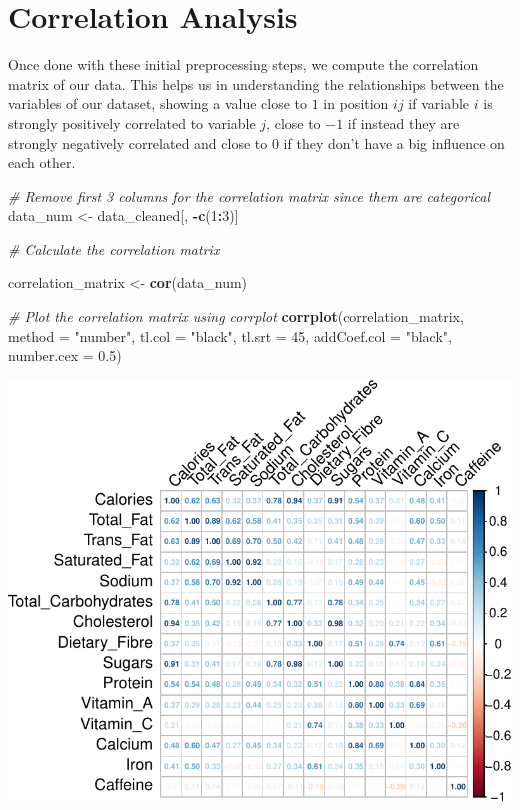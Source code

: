 \documentclass[
]{article}
\newenvironment{Shaded}{\begin{snugshade}}{\end{snugshade}}
\newcommand{\AttributeTok}[1]{\textcolor[rgb]{0.13,0.29,0.53}{#1}}
\newcommand{\CommentTok}[1]{\textcolor[rgb]{0.56,0.35,0.01}{\textit{#1}}}
\newcommand{\DecValTok}[1]{\textcolor[rgb]{0.00,0.00,0.81}{#1}}
\newcommand{\FloatTok}[1]{\textcolor[rgb]{0.00,0.00,0.81}{#1}}
\newcommand{\FunctionTok}[1]{\textcolor[rgb]{0.13,0.29,0.53}{\textbf{#1}}}
\newcommand{\NormalTok}[1]{#1}
\newcommand{\OtherTok}[1]{\textcolor[rgb]{0.56,0.35,0.01}{#1}}
\newcommand{\SpecialCharTok}[1]{\textcolor[rgb]{0.81,0.36,0.00}{\textbf{#1}}}
\newcommand{\StringTok}[1]{\textcolor[rgb]{0.31,0.60,0.02}{#1}}
\begin{document}
\hypertarget{correlation-analysis}{%
\section{Correlation Analysis}\label{correlation-analysis}}

Once done with these initial preprocessing steps, we compute the
correlation matrix of our data. This helps us in understanding the
relationships between the variables of our dataset, showing a value
close to \(1\) in position \(ij\) if variable \(i\) is strongly
positively correlated to variable \(j\), close to \(-1\) if instead they
are strongly negatively correlated and close to \(0\) if they don't have
a big influence on each other.

\begin{Shaded}
\begin{Highlighting}[]
\CommentTok{\# Remove first 3 columns for the correlation matrix since them are categorical}
\NormalTok{data\_num }\OtherTok{\textless{}{-}}\NormalTok{ data\_cleaned[, }\SpecialCharTok{{-}}\FunctionTok{c}\NormalTok{(}\DecValTok{1}\SpecialCharTok{:}\DecValTok{3}\NormalTok{)]}

\CommentTok{\# Calculate the correlation matrix}

\NormalTok{correlation\_matrix }\OtherTok{\textless{}{-}} \FunctionTok{cor}\NormalTok{(data\_num)}

\CommentTok{\# Plot the correlation matrix using corrplot}
\FunctionTok{corrplot}\NormalTok{(correlation\_matrix, }\AttributeTok{method =} \StringTok{"number"}\NormalTok{, }\AttributeTok{tl.col =} \StringTok{"black"}\NormalTok{, }
         \AttributeTok{tl.srt =} \DecValTok{45}\NormalTok{, }\AttributeTok{addCoef.col =} \StringTok{"black"}\NormalTok{, }\AttributeTok{number.cex =} \FloatTok{0.5}\NormalTok{)}
\end{Highlighting}
\end{Shaded}

\begin{center}\includegraphics{Statistical_Learning_Final_Report_files/figure-latex/correlation_analysis-1} \end{center}
\end{document}
